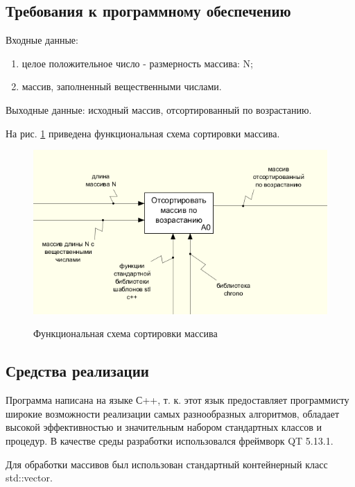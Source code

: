\documentclass[a4paper,12pt]{article}
\begin{document}
	\subsection{Требования к программному обеспечению}
	Входные данные: 
	 \begin{enumerate} 
	 \item[1)] целое положительное число - размерность массива: N;
	 \item[2)] массив, заполненный вещественными числами.
	 \end{enumerate}
	
	Выходные данные: исходный массив, отсортированный по возрастанию.
	
	На рис. \ref{fig:idef0} приведена функциональная схема сортировки массива.
        
        \begin{figure}[h!]
        	\begin{center}
        		{\includegraphics[width = \textwidth]{idef0.png}}
        		\caption{Функциональная схема сортировки массива}
        		\label{fig:idef0}
        	\end{center}
        \end{figure}
        
	
	\subsection{Средства реализации}
	Программа написана на языке С++, т. к. этот язык предоставляет программисту широкие возможности реализации самых разнообразных алгоритмов, обладает высокой эффективностью и значительным набором стандартных классов и процедур. В качестве среды разработки использовался  фреймворк QT 5.13.1.
	
	Для обработки массивов был использован стандартный контейнерный класс std::vector.
	
\end{document}
